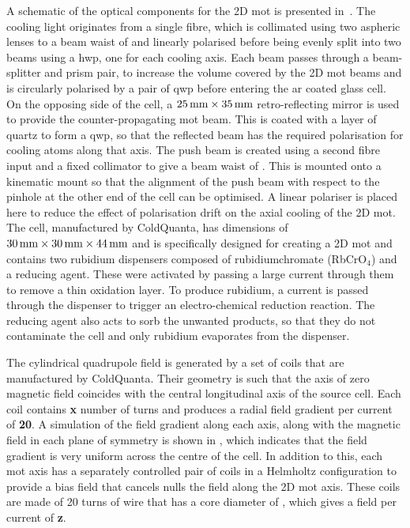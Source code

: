 A schematic of the optical components for the 2D \ac{mot} is presented in~. The cooling light originates from a single fibre, which is collimated using two aspheric lenses to a beam waist of  and linearly polarised before being evenly split into two beams using a \ac{hwp}, one for each cooling axis. Each beam passes through a beam-splitter and prism pair, to increase the volume covered by the 2D \ac{mot} beams and is circularly polarised by a pair of \ac{qwp} before entering the \ac{ar} coated glass cell. On the opposing side of the cell, a \(\sivalue{25}{\milli\metre} \times \sivalue{35}{\milli\metre}\) retro-reflecting mirror is used to provide the counter-propagating \ac{mot} beam. This is coated with a layer of quartz to form a \ac{qwp}, so that the reflected beam has the required polarisation for cooling atoms along that axis. The push beam is created using a second fibre input and a fixed collimator to give a beam waist of . This is mounted onto a  kinematic mount so that the alignment of the push beam with respect to the  pinhole at the other end of the cell can be optimised. A linear polariser is placed here to reduce the effect of polarisation drift on the axial cooling of the 2D \ac{mot}. The cell, manufactured by ColdQuanta, has dimensions of \(\sivalue{30}{\milli\metre} \times \sivalue{30}{\milli\metre} \times \sivalue{44}{\milli\metre}\) and is specifically designed for creating a 2D\+ \ac{mot} and contains two rubidium dispensers composed of rubidiumchromate (RbCrO\(_4\)) and a reducing agent. These were activated by passing a large current through them to remove a thin oxidation layer. To produce rubidium, a current is passed through the dispenser to trigger an electro-chemical reduction reaction. The reducing agent also acts to sorb the unwanted products, so that they do not contaminate the cell and only rubidium evaporates from the dispenser. \par\noindent
The cylindrical quadrupole field is generated by a set of coils that are manufactured by ColdQuanta. Their geometry is such that the axis of zero magnetic field coincides with the central longitudinal axis of the source cell. Each coil contains {\textbf {x}} number of turns and produces a radial field gradient per current of {\textbf {20}}\;\sivalue{}{\gauss\per\centi\metre\per\ampere}. A simulation of the field gradient along each axis, along with the magnetic field in each plane of symmetry is shown in , which indicates that the field gradient is very uniform across the centre of the cell. In addition to this, each \ac{mot} axis has a separately controlled pair of coils in a Helmholtz configuration to provide a bias field that cancels nulls the field along the 2D \ac{mot} axis. These coils are made of 20 turns of wire that has a core diameter of , which gives a field per current of {\textbf{z}}\;\sivalue{}{\gauss\per\ampere}.
